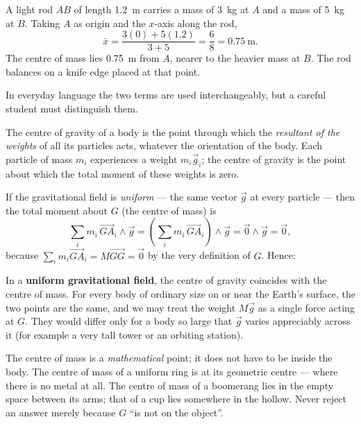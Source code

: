 \documentclass[11pt]{article}
\newcommand{\cle}[1]{{\popxbold\color{popdark}#1}}
\newcounter{popsec}
\newcounter{popsub}
\newcommand{\courssub}[1]{%
  \stepcounter{popsub}%
  \par\vspace{9pt}\noindent{\popxbold\fontsize{11.5}{13}\selectfont\color{popink}{\color{poporange}\thepopsec.\thepopsub}\hspace{6pt}#1}\par\nopagebreak\vspace{4pt}
}
\begin{document}
\begin{exemplebox}
A light rod $AB$ of length \SI{1.2}{m} carries a mass of \SI{3}{kg} at $A$ and a mass of \SI{5}{kg} at $B$. Taking $A$ as origin and the $x$-axis along the rod,
\[
\bar{x}=\frac{3(0)+5(1.2)}{3+5}=\frac{6}{8}=0.75\ \mathrm{m}.
\]
The centre of mass lies \SI{0.75}{m} from $A$, nearer to the heavier mass at $B$. The rod balances on a knife edge placed at that point.
\end{exemplebox}

\courssub{Centre of Mass and Centre of Gravity}

In everyday language the two terms are used interchangeably, but a careful student must distinguish them.

\begin{definition}
The \cle{centre of gravity} of a body is the point through which the \emph{resultant of the weights} of all its particles acts, whatever the orientation of the body. Each particle of mass $m_i$ experiences a weight $m_i\vec{g}_i$; the centre of gravity is the point about which the total moment of these weights is zero.
\end{definition}

If the gravitational field is \emph{uniform} — the same vector $\vec{g}$ at every particle — then the total moment about $G$ (the centre of mass) is
\[
\sum_{i} m_i\,\vec{GA}_i\wedge\vec{g}=\left(\sum_{i}m_i\,\vec{GA}_i\right)\wedge\vec{g}=\vec{0}\wedge\vec{g}=\vec{0},
\]
because $\sum_i m_i\vec{GA}_i=M\vec{GG}=\vec{0}$ by the very definition of $G$. Hence:

\begin{propriete}
In a \textbf{uniform gravitational field}, the centre of gravity coincides with the centre of mass. For every body of ordinary size on or near the Earth's surface, the two points are the same, and we may treat the weight $M\vec{g}$ as a single force acting at $G$. They would differ only for a body so large that $\vec{g}$ varies appreciably across it (for example a very tall tower or an orbiting station).
\end{propriete}

\begin{attention}
The centre of mass is a \emph{mathematical} point; it does not have to be inside the body. The centre of mass of a uniform ring is at its geometric centre — where there is no metal at all. The centre of mass of a boomerang lies in the empty space between its arms; that of a cup lies somewhere in the hollow. Never reject an answer merely because $G$ ``is not on the object''.
\end{attention}
\end{document}
